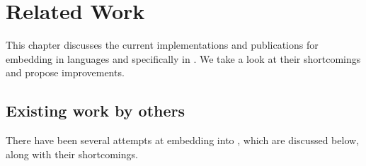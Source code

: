 \documentclass[thesis-solanki.tex]{subfiles}
\begin{document}
\chapter{Related Work}\label{chap:proposedWork}

This chapter discusses the current implementations and publications for embedding  in languages
and specifically in . We take a look at their shortcomings and propose improvements.


\section{Existing work by others} \label{sec:existing-work-by-others}

There have been several attempts at embedding  into , which are
discussed below, along with their shortcomings.
\end{document}
